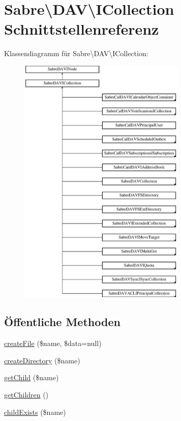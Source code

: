 \hypertarget{interface_sabre_1_1_d_a_v_1_1_i_collection}{}\section{Sabre\textbackslash{}D\+AV\textbackslash{}I\+Collection Schnittstellenreferenz}
\label{interface_sabre_1_1_d_a_v_1_1_i_collection}
Klassendiagramm für Sabre\textbackslash{}D\+AV\textbackslash{}I\+Collection\+:\begin{figure}[H]
\begin{center}
\leavevmode
\includegraphics[height=12.000000cm]{interface_sabre_1_1_d_a_v_1_1_i_collection}
\end{center}
\end{figure}
\subsection*{Öffentliche Methoden}
\begin{DoxyCompactItemize}
\item 
\mbox{\hyperlink{interface_sabre_1_1_d_a_v_1_1_i_collection_a837d88dac548706770368200f83c2ebc}{create\+File}} (\$name, \$data=null)
\item 
\mbox{\hyperlink{interface_sabre_1_1_d_a_v_1_1_i_collection_a11e8eb888fffe1d792acebbe5bc59243}{create\+Directory}} (\$name)
\item 
\mbox{\hyperlink{interface_sabre_1_1_d_a_v_1_1_i_collection_a09f82b07550611752abb149f468b89c2}{get\+Child}} (\$name)
\item 
\mbox{\hyperlink{interface_sabre_1_1_d_a_v_1_1_i_collection_a5344a6890e49fd7a81bb0e38b4c6d0be}{get\+Children}} ()
\item 
\mbox{\hyperlink{interface_sabre_1_1_d_a_v_1_1_i_collection_a81b44dc1354370890279af58c34c7375}{child\+Exists}} (\$name)
\end{DoxyCompactItemize}


